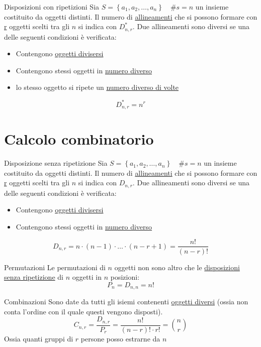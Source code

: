 \begin{definizione}{Disposizioni con ripetizioni}
	Sia $ S = \left\{a_1,a_2,\ldots , a_n\right\} \quad \#s = n $ un insieme costituito da oggetti distinti. Il numero di \underline{allineamenti} che si possono formare con \underline{r} oggetti scelti tra gli $ n $ si indica con $ D_{n,r}^{*} $. Due allineamenti sono diversi se una delle seguenti condizioni è verificata:
	\begin{itemize}
		\item Contengono \underline{oggetti divisersi}
		\item Contengono stessi oggetti in \underline{numero diverso}
		\item lo stesso oggetto si ripete un \underline{numero diverso di volte}
	\end{itemize}
	\[
		D_{n, r}^{*} = n ^{r}
	\]
\end{definizione}
\section{Calcolo combinatorio}
\begin{definizione}{Disposizione senza ripetizione}
	Sia $ S = \left\{a_1,a_2,\ldots , a_n\right\} \quad \#s = n $ un insieme costituito da oggetti distinti. Il numero di \underline{allineamenti} che si possono formare con \underline{r} oggetti scelti tra gli $ n $ si indica con $ D_{n,r} $. Due allineamenti sono diversi se una delle seguenti condizioni è verificata:
	\begin{itemize}
		\item Contengono \underline{oggetti divisersi}
		\item Contengono stessi oggetti in \underline{numero diverso}
	\end{itemize}
	\[
		D_{n,r} = n \cdot  \left(n-1\right) \cdot  \ldots \cdot \left(n-r +1\right)=\frac{n!}{\left(n-r\right)!}
	\]
\end{definizione}
\begin{definizione}{Permutazioni}
	Le permutazioni di $ n $ oggetti non sono altro che le \underline{disposizioni senza ripetizione} di $ n  $ oggetti in $ n $ posizioni:
	\[
		P_n = D_{n,n} = n!
	\]
\end{definizione}
\begin{definizione}{Combinazioni}
	Sono date da tutti gli isiemi contenenti \underline{oggetti diversi} (ossia non conta l'ordine con il quale questi vengono disposti).
	\[
		C_{n,r} = \frac{D_{n,r}}{P_r} = \frac{n!}{\left(n-r\right)! \cdot r!} = \binom{n}{r}
	\]
	Ossia quanti gruppi di $ r $ persone posso estrarne da $ n $
\end{definizione}
